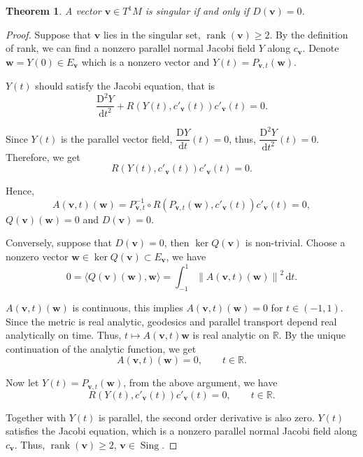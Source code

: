\documentclass[reqno,11pt]{article}
\newtheorem{theorem}{Theorem}[section]
\theoremstyle{definition}
\theoremstyle{remark}
\numberwithin{equation}{section}
\DeclareMathOperator{\rank}{rank}
\DeclareMathOperator{\sing}{Sing}
\begin{document}
\begin{theorem}\label{thm_6_1}
	A vector $\bm v\in T^1M$ is singular if and only if $D(\bm{v})=0$.
\end{theorem}

\begin{proof}
	Suppose that $\bm{v}$ lies in the singular set, $\rank(\bm{v})\ge 2$. By the definition of rank, we can find a nonzero parallel normal Jacobi field $Y$ along $c_{\bm{v}}$. Denote $\bm{w}=Y(0)\in E_{\bm{v}}$ which is a nonzero vector and $Y(t)=P_{\bm{v},t}(\bm{w})$.

	$Y(t)$ should satisfy the Jacobi equation, that is
	\begin{displaymath}
		\dfrac{\mathrm{D}^2 Y}{\mathrm{d}t^{2}}+R(Y(t),c'_{\bm{v}}(t))c'_{\bm{v}}(t)=0.
	\end{displaymath}

	Since $Y(t)$ is the parallel vector field, $\dfrac{\mathrm{D}Y}{\mathrm{d}t}(t)=0$, thus, $\dfrac{\mathrm{D}^{2}Y}{\mathrm{d}t^2}(t)=0$. Therefore, we get
	\begin{displaymath}
		R(Y(t),c'_{\bm{v}}(t))c'_{\bm{v}}(t)=0.
	\end{displaymath}

	Hence,
	\begin{displaymath}
		A(\bm{v},t)(\bm{w})=P^{-1}_{\bm{v},t}\circ R(P_{\bm{v},t}(\bm{w}),c'_{\bm{v}}(t))c'_{\bm{v}}(t)=0,
	\end{displaymath}
	$Q(\bm{v})(\bm{w})=0$ and $D(\bm{v})=0$.

	Conversely, suppose that $D(\bm{v})=0$, then $\ker Q(\bm{v})$ is non-trivial. Choose a nonzero vector $\bm{w}\in \ker Q(\bm{v})\subset E_{\bm{v}}$, we have
	\begin{displaymath}
		0=\langle Q(\bm{v})(\bm{w}),\bm{w}\rangle=\int_{-1}^{1} {\lVert A(\bm{v},t)(\bm{w})\rVert}^{2}\,\mathrm{d}t.
	\end{displaymath}

	$A(\bm{v},t)(\bm{w})$ is continuous, this implies $A(\bm{v},t)(\bm{w})=0$ for $t\in (-1,1)$. Since the metric is real analytic, geodesics and parallel transport depend real analytically on time. Thus, $t\mapsto A(\bm{v},t)\bm{w}$ is real analytic on $\mathbb{R}$. By the unique continuation of the analytic function, we get
	\begin{displaymath}
		A(\bm{v},t)(\bm{w})=0,\qquad t\in\mathbb{R}.
	\end{displaymath}

	Now let $Y(t)=P_{\bm{v},t}(\bm{w})$, from the above argument, we have
	\begin{displaymath}
		R(Y(t),c'_{\bm{v}}(t))c'_{\bm{v}}(t)=0,\qquad t\in\mathbb{R}.
	\end{displaymath}

	Together with $Y(t)$ is parallel, the second order derivative is also zero. $Y(t)$ satisfies the Jacobi equation, which is a nonzero parallel normal Jacobi field along $c_{\bm{v}}$. Thus, $\rank(\bm{v})\ge 2$, $\bm{v}\in\sing$.
\end{proof}
\end{document}
